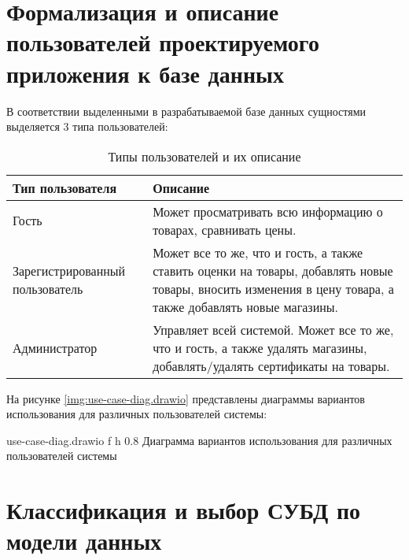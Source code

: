 \section{Формализация и описание пользователей проектируемого приложения к базе данных}

В соответствии выделенными в разрабатываемой базе данных сущностями выделяется 3 типа пользователей:

\begin{table}[ht]
	\begin{center}
		\begin{threeparttable}
			\caption{Типы пользователей и их описание}
			\label{tbl:db_roles}
			\begin{tabular}{|p{4.5cm}|p{10cm}|}
					\hline
					\textbf{Тип пользователя} & \textbf{Описание} \\ \hline
					Гость & Может просматривать всю информацию о товарах, сравнивать цены. \\
					\hline
					Зарегистрированный пользователь & Может все то же, что и гость, а также ставить оценки на товары, добавлять новые товары, вносить изменения в цену товара, а также добавлять новые магазины. \\
					\hline
					Администратор & Управляет всей системой. Может все то же, что и гость, а также удалять магазины, добавлять/удалять сертификаты на товары. \\ 
					\hline
				\end{tabular}
		\end{threeparttable}
	\end{center}
\end{table}

\clearpage

На рисунке \ref{img:use-case-diag.drawio} представлены диаграммы вариантов использования для различных пользователей системы:

{use-case-diag.drawio} %
{f} %
{h} %
{0.8\textwidth} %
{Диаграмма вариантов использования для различных пользователей системы} %

\clearpage

\section{Классификация и выбор СУБД по модели данных}

